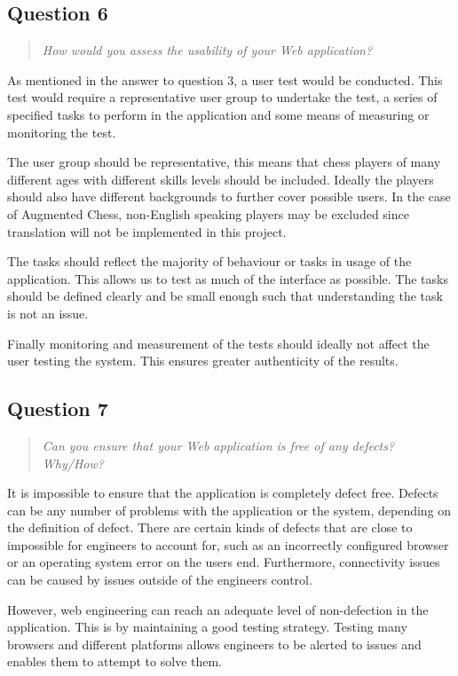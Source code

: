 \documentclass[10pt,a4paper]{report}
\begin{document}
\subsection*{Question 6}
\begin{quote}
\textit{How would you assess the usability of your Web application?}
\end{quote}
As mentioned in the answer to question 3, a user test would be conducted.  This test would require a representative user group to undertake the test, a series of specified tasks to perform in the application and some means of measuring or monitoring the test.

The user group should be representative, this means that chess players of many different ages with different skills levels should be included. Ideally the players should also have different backgrounds to further cover possible users. In the case of Augmented Chess, non-English speaking players may be excluded since translation will not be implemented in this project.

The tasks should reflect the majority of behaviour or tasks in usage of the application. This allows us to test as much of the interface as possible. The tasks should be defined clearly and be small enough such that understanding the task is not an issue.

Finally monitoring and measurement of the tests should ideally not affect the user testing the system. This ensures greater authenticity of the results.
\subsection*{Question 7}
\begin{quote}
\textit{Can you ensure that your Web application is free of any defects? Why/How?}
\end{quote}

It is impossible to ensure that the application is completely defect free. Defects can be any number of problems with the application or the system, depending on the definition of defect. There are certain kinds of defects that are close to impossible for engineers to account for, such as an incorrectly configured browser or an operating system error on the users end. Furthermore, connectivity issues can be caused by issues outside of the engineers control.

However, web engineering can reach an adequate level of non-defection in the application. This is by maintaining a good testing strategy. Testing many browsers and different platforms allows engineers to be alerted to issues and enables them to attempt to solve them.
\end{document}

